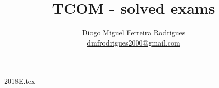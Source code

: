 \documentclass[a4paper]{article}
\title{TCOM - solved exams}
\author{Diogo Miguel Ferreira Rodrigues \\ \href{mailto:dmfrodrigues2000@gmail.com}{dmfrodrigues2000@gmail.com}}
\date{}
\begin{document}
\begingroup
	\maketitle
	\let\clearpage\relax
	\setcounter{tocdepth}{2}
	\tableofcontents
\endgroup
{2018E.tex}
\end{document}
